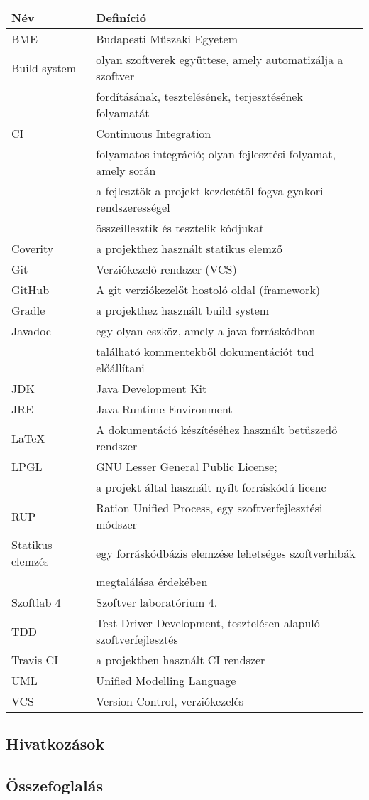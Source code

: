 \begin{tabularx}{\textwidth}{| l | l |}
\hline
\textbf{Név} & \textbf{Definíció} \tabularnewline 
\hline\hline
BME & Budapesti Műszaki Egyetem \tabularnewline \hline
Build system & olyan szoftverek együttese, amely automatizálja a szoftver \\
             & fordításának, tesztelésének, terjesztésének folyamatát \tabularnewline \hline
CI & Continuous Integration \\ 
   & folyamatos integráció; olyan fejlesztési folyamat, amely során \\
   & a fejlesztök a projekt kezdetétöl fogva gyakori rendszerességel \\
   & összeillesztik és tesztelik kódjukat\tabularnewline \hline
Coverity & a projekthez használt statikus elemző \tabularnewline \hline
Git & Verziókezelő rendszer (VCS) \tabularnewline \hline
GitHub & A git verziókezelőt hostoló oldal (framework) \tabularnewline \hline
Gradle & a projekthez használt build system \tabularnewline \hline
Javadoc & egy olyan eszköz, amely a java forráskódban \\ 
        & található kommentekből dokumentációt tud előállítani \tabularnewline \hline
JDK & Java Development Kit \tabularnewline \hline
JRE & Java Runtime Environment \tabularnewline \hline
LaTeX & A dokumentáció készítéséhez használt betűszedő rendszer \tabularnewline \hline
LPGL & GNU Lesser General Public License; \\ 
     & a projekt által használt nyílt forráskódú licenc \tabularnewline \hline
RUP & Ration Unified Process, egy szoftverfejlesztési módszer \tabularnewline \hline
Statikus elemzés & egy forráskódbázis elemzése lehetséges szoftverhibák \\
                  & megtalálása érdekében \tabularnewline \hline
Szoftlab 4 & Szoftver laboratórium 4. \tabularnewline \hline
TDD & Test-Driver-Development, tesztelésen alapuló szoftverfejlesztés \tabularnewline \hline
Travis CI & a projektben használt CI rendszer \tabularnewline \hline
UML & Unified Modelling Language \tabularnewline \hline
VCS & Version Control, verziókezelés \tabularnewline \hline
\end{tabularx}


\subsection{Hivatkozások}

\subsection{Összefoglalás}

